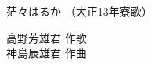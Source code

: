 \documentclass[10pt,b5j]{tarticle} %
\begin{document}
\begin{minipage}[c]{0.7\hsize} %
    \begin{center}
        {\LARGE
            茫々はるか %
        }
        {\small 
            （大正13年寮歌） %
        }
    \end{center}
\end{minipage}
\begin{minipage}[c]{0.3\hsize} %
    \begin{flushright} %
        高野芳雄君 作歌\\神島辰雄君 作曲 %
    \end{flushright}
\end{minipage}
\end{document}
